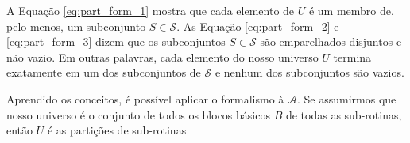 		A Equação \ref{eq:part_form_1} mostra que cada elemento de $ U $ é um membro de, pelo menos, um subconjunto $ S \in \mathcal{S} $. As Equação \ref{eq:part_form_2} e \ref{eq:part_form_3} dizem que os subconjuntos $ S \in \mathcal{S} $ são emparelhados disjuntos e não vazio. Em outras palavras, cada elemento do nosso universo $ U $ termina exatamente em um dos subconjuntos de $\mathcal{S}$ e nenhum dos subconjuntos são vazios.

		Aprendido os conceitos, é possível aplicar o formalismo à $ \mathcal{A} $. Se assumirmos que nosso universo é o conjunto de todos os blocos básicos $B$ de todas as sub-rotinas, então $U$ é as partições de sub-rotinas

